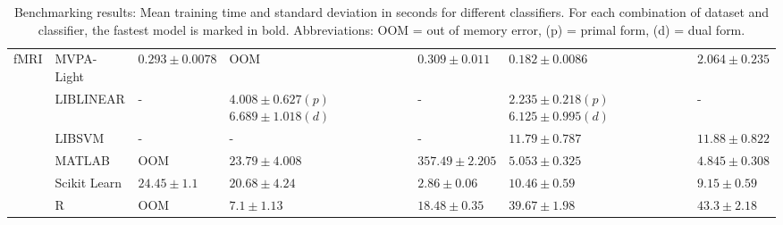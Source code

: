 \documentclass[utf8]{frontiersSCNS} %
\begin{document}
\begin{table}
\begin{tabular}{ |p{1.1cm}|p{1.7cm}|p{2cm}|p{2.1cm}|p{2cm}|p{2.1cm}|p{2cm}|}
  \hline
\multirow{6}{1.3cm}{fMRI} & MVPA-Light & $\mathbf{0.293}\pm0.0078$ & OOM & $\mathbf{0.309}\pm0.011$ & $\mathbf{0.182}\pm0.0086$ & $\mathbf{2.064}\pm0.235$\\
\cline{2-7}
  & LIBLINEAR & - & $\mathbf{4.008}\pm0.627(p)$ $6.689\pm1.018(d)$ & - & $2.235\pm0.218(p)$ $6.125\pm0.995(d)$ & - \\
\cline{2-7}
  & LIBSVM & - & - & - & $11.79\pm0.787$ & $11.88\pm0.822$ \\
\cline{2-7}
  & MATLAB & OOM & $23.79\pm4.008$ & $357.49\pm2.205$ & $5.053\pm0.325$ & $4.845\pm0.308$\\
\cline{2-7}
   & Scikit Learn & $24.45\pm1.1$ & $20.68\pm4.24$ & $2.86\pm0.06$ & $10.46\pm0.59$ & $9.15\pm0.59$\\
\cline{2-7}
  & R & OOM & $7.1\pm1.13$ & $18.48\pm0.35$ & $39.67\pm1.98$ & $43.3\pm2.18$ \\\hline
\end{tabular}
\caption{Benchmarking results: Mean training time and standard deviation in seconds for different classifiers. For each combination of dataset and classifier, the fastest model is marked in bold. Abbreviations: OOM = out of memory error, (p) = primal form, (d) = dual form.}
\label{tab:classification}
\end{table}
\end{document}
